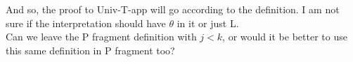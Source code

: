 \message{ !name(Polymorphic_Value_Interp.tex)}\documentclass[12pt]{article}
\author{Ankit Kumar}
\begin{document}

And so, the proof to Univ-T-app will go according to the definition.
I am not sure if the interpretation should have $\theta$ in it or just
L.\\
Can we leave the P fragment definition with $j<k$, or would it be better
to use this same definition in P fragment too?
\end{document}
